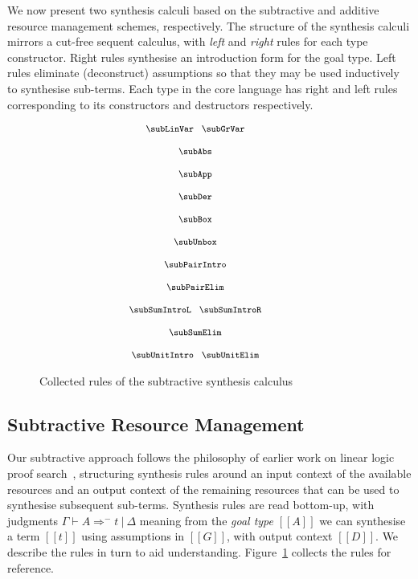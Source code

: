 We now present two synthesis calculi based on the subtractive and additive resource
management schemes, respectively. The structure of the synthesis calculi mirrors a
cut-free sequent calculus, with
\textit{left} and \textit{right} rules for each type constructor. Right rules
synthesise an introduction form for the goal type. Left rules
eliminate (deconstruct) assumptions so that they may be
used inductively to synthesise sub-terms. Each type in the
core language has right and left
rules corresponding to its constructors and destructors respectively.


\begin{figure}[t]
\begin{gather*}
{\footnotesize{
  \hspace{-3em}\begin{array}{c}
    \subLinVar
    \;\;\;
    \subGrVar
    \\[1.25em]
    \subAbs
    \\[1.25em]
    \subApp
    \\[1.25em]
    \subDer
    \\[1.25em]
    \subBox
    \\[1.25em]
    \subUnbox
    \\[1.25em]
    \subPairIntro
    \\[1.25em]
    \subPairElim
    \\[1.25em]
    \subSumIntroL
    \;\;\;
    \subSumIntroR
    \\[1.25em]
    \subSumElim
    \\[1.25em]
    \subUnitIntro
    \;\;\;
    \subUnitElim
  \end{array}
}}
\end{gather*}
\caption{Collected rules of the subtractive synthesis calculus}
\label{fig:sub-rules}
  \end{figure}



\subsection{Subtractive Resource Management}
\label{subsec:subtractive}
  Our subtractive approach follows the philosophy of earlier work on
  linear logic proof search~\citep{HODAS1994327,CERVESATO2000133},
  structuring synthesis rules around an input context of the available
  resources and an output context of the remaining resources that
  can be used to synthesise subsequent sub-terms. Synthesis rules
  are read bottom-up, with judgments $\Gamma \vdash A \Rightarrow^{-} t\ |\ \Delta$
  meaning from the \emph{goal type} $[[A]]$ we can synthesise a term $[[t]]$ using
  assumptions in $[[G]]$, with output context $[[D]]$. We describe
  the rules in turn to aid understanding. Figure~\ref{fig:sub-rules} collects the
  rules for reference.
